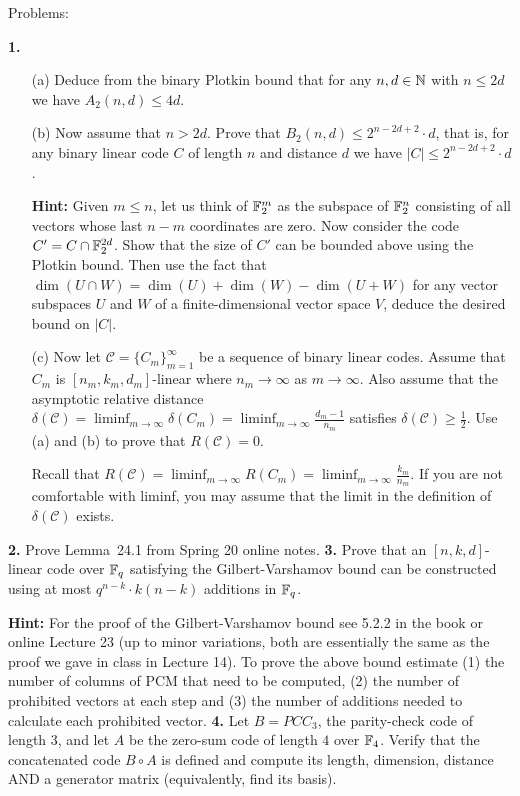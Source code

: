 \documentclass[12pt]{amsart}
\begin{document}
\bf\centerline{Problems: }\rm
\skv
{\bf 1.} 
\begin{itemize}
\item[(a)] Deduce from the binary Plotkin bound that for any $n,d\in{\mathbb N}$ with $n\leq 2d$ we have $A_2(n,d)\leq 4d$.
\item[(b)] Now assume that $n>2d$. Prove that $B_2(n,d)\leq 2^{n-2d+2}\cdot d$, that is, for any binary linear code $C$ of length $n$ and distance $d$ we have $|C|\leq 2^{n-2d+2}\cdot d$. 

{\bf Hint:} Given $m\leq n$, let us think of ${\mathbb F}_2^m$ as the subspace of
${\mathbb F}_2^n$ consisting of all vectors whose last $n-m$ coordinates are zero. Now consider the code $C'=C\cap {\mathbb F}_{2}^{2d}$.
Show that the size of $C'$ can be bounded above using the Plotkin bound. Then use the fact that 
$\dim(U\cap W)=\dim(U)+\dim(W)-\dim(U+W)$ for any vector subspaces $U$ and $W$ of a finite-dimensional vector space $V$,
deduce the desired bound on $|C|$. 
\item[(c)] Now let $\mathcal C=\{C_m\}_{m=1}^{\infty}$ be a sequence of binary linear codes. Assume that 
$C_m$ is $[n_m,k_m,d_m]$-linear where $n_m\to\infty$ as $m\to\infty$. Also assume that the asymptotic relative distance 
$\delta(\mathcal C)=\liminf_{m\to\infty}\delta(C_m)=\liminf_{m\to\infty} \frac{d_m-1}{n_m}$ satisfies
$\delta(\mathcal C)\geq \frac{1}{2}$. Use (a) and (b) to prove that $R(\mathcal C)=0$. 

Recall that $R(\mathcal C)=\liminf_{m\to\infty}R(C_m)=\liminf_{m\to\infty} \frac{k_m}{n_m}$. If you are not comfortable with
liminf, you may assume that the limit in the definition of $\delta(\mathcal C)$ exists.
\end{itemize}
\skv
{\bf 2.} Prove Lemma~24.1 from Spring 20 online notes.
\skv
{\bf 3.} Prove that an $[n,k,d]$-linear code over ${\mathbb F}_q$ satisfying the Gilbert-Varshamov bound can be constructed using at most $q^{n-k}\cdot k(n-k)$ additions in ${\mathbb F}_q$. 
\skv

{\bf Hint:} For the proof of the Gilbert-Varshamov bound see 5.2.2 in the book or online Lecture 23 (up to minor variations, both are essentially the same as the proof we gave in class in Lecture 14). To prove the above bound estimate (1) the number of columns of PCM that need to be computed, (2) the number of prohibited vectors at each step and (3)
the number of additions needed to calculate each prohibited vector. 
\skv
{\bf 4.} Let $B=PCC_3$, the parity-check code of length $3$, and let $A$ be the zero-sum code of length $4$ over ${\mathbb F}_4$. Verify that the concatenated code $B\circ A$ is defined and compute its length, dimension, distance AND a generator matrix (equivalently, find its basis). 
\skv
\end{document}
